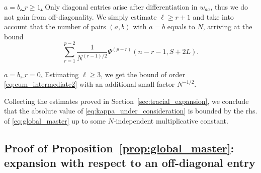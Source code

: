 \documentclass[10pt]{amsart}
\numberwithin{equation}{section}
\newcommand{\nc}{\normalcolor}
\begin{document}
\smallskip

\noindent\underline{$a=b$, $r\ge 1$.} Only diagonal entries arise after differentiation in $w_{aa}$, thus we do not gain from off-diagonality. We simply estimate $\ell\ge r+1$ and take into account that the number of pairs $(a,b)$ with $a=b$ equals to $N$, arriving at the bound
\begin{equation}
\sum_{r=1}^{p-2}\frac{1}{N^{(r-1)/2}} \Psi^{(p-r)}(n-r-1,S+2L).
\label{eq:cum_intermediate3}
\end{equation}


\smallskip

\noindent\underline{$a=b$, $r=0$.} Estimating $\ell\ge 3$, we get the bound of order \eqref{eq:cum_intermediate2} with an additional small factor $N^{-1/2}$.

\smallskip

Collecting the estimates proved in Section~\ref{sec:tracial_expansion}, we conclude that the absolute value of \eqref{eq:kappa_under_consideration} is bounded by the rhs. of \eqref{eq:global_master} up to some $N$-independent multiplicative constant.\nc


\subsection{Proof of Proposition~\ref{prop:global_master}: expansion with respect to an off-diagonal entry}\label{sec:off_diag_expansion}
\end{document}
